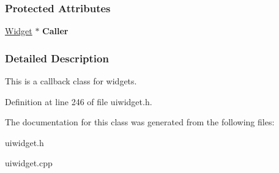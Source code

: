 \subsubsection*{Protected Attributes}
\begin{DoxyCompactItemize}
\item 
\hypertarget{classMezzanine_1_1UI_1_1WidgetCallback_a44825154b17a4b800b3991b0c593e034}{
\hyperlink{classMezzanine_1_1UI_1_1Widget}{Widget} $\ast$ {\bfseries Caller}}
\label{classMezzanine_1_1UI_1_1WidgetCallback_a44825154b17a4b800b3991b0c593e034}

\end{DoxyCompactItemize}


\subsubsection{Detailed Description}
This is a callback class for widgets. 

Definition at line 246 of file uiwidget.h.



The documentation for this class was generated from the following files:\begin{DoxyCompactItemize}
\item 
uiwidget.h\item 
uiwidget.cpp\end{DoxyCompactItemize}
